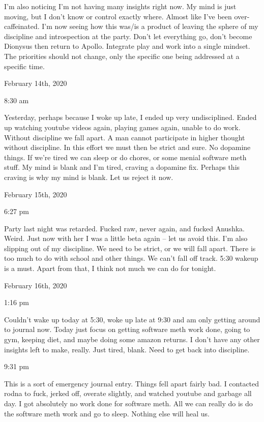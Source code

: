\qquad I'm also noticing I'm not having many insights right now. My mind
is just moving, but I don't know or control exactly where. Almost like
I've been over-caffeinated. I'm now seeing how this was/is a product of
leaving the sphere of my discipline and introspection at the party.
Don't let everything go, don't become Dionysus then return to Apollo.
Integrate play and work into a single mindset. The priorities should not
change, only the specific one being addressed at a specific time.

\bigskip
\bigskip
February 14th, 2020

8:30 am

Yesterday, perhaps because I woke up late, I ended up very
undisciplined. Ended up watching youtube videos again, playing games
again, unable to do work. Without discipline we fall apart. A man cannot
participate in higher thought without discipline. In this effort we must
then be strict and sure. No dopamine things. If we're tired we can sleep
or do chores, or some menial software meth stuff. My mind is blank and
I'm tired, craving a dopamine fix. Perhaps this craving is why my mind
is blank. Let us reject it now.

\bigskip
\bigskip
February 15th, 2020

6:27 pm

Party last night was retarded. Fucked raw, never again, and fucked
Anushka. Weird. Just now with her I was a little beta again -- let us
avoid this. I'm also slipping out of my discipline. We need to be
strict, or we will fall apart. There is too much to do with school and
other things. We can't fall off track. 5:30 wakeup is a must. Apart from
that, I think not much we can do for tonight.

\bigskip
\bigskip
February 16th, 2020

1:16 pm

Couldn't wake up today at 5:30, woke up late at 9:30 and am only getting
around to journal now. Today just focus on getting software meth work
done, going to gym, keeping diet, and maybe doing some amazon returns. I
don't have any other insights left to make, really. Just tired, blank.
Need to get back into discipline.

9:31 pm

This is a sort of emergency journal entry. Things fell apart fairly bad.
I contacted rodna to fuck, jerked off, overate slightly, and watched
youtube and garbage all day. I got absolutely no work done for software
meth. All we can really do is do the software meth work and go to sleep.
Nothing else will heal us.

